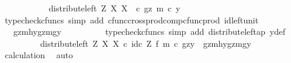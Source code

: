 \begin{isabellebody}
\ \ \ \ \ \ \isamarkupfalse%
\ \isamarkupfalse%
\ {\isachardoublequoteopen}{\isachardot}{\kern0pt}{\isachardot}{\kern0pt}{\isachardot}{\kern0pt}\ {\isacharequal}{\kern0pt}\ distribute{\isacharunderscore}{\kern0pt}left\ Z\ X\ X\ \ {\isasymcirc}\isactrlsub c\ {\isasymlangle}gz{\isacharcomma}{\kern0pt}\ m\ {\isasymcirc}\isactrlsub c\ y{\isasymrangle}{\isachardoublequoteclose}\isanewline
\ \ \ \ \ \ \ \ \isamarkupfalse%
\ {\isacharparenleft}{\kern0pt}typecheck{\isacharunderscore}{\kern0pt}cfuncs{\isacharcomma}{\kern0pt}\ simp\ add{\isacharcolon}{\kern0pt}\ cfunc{\isacharunderscore}{\kern0pt}cross{\isacharunderscore}{\kern0pt}prod{\isacharunderscore}{\kern0pt}comp{\isacharunderscore}{\kern0pt}cfunc{\isacharunderscore}{\kern0pt}prod\ id{\isacharunderscore}{\kern0pt}left{\isacharunderscore}{\kern0pt}unit{}{\isacharparenright}{\kern0pt}\isanewline
\ \ \ \ \ \ \isamarkupfalse%
\ \isamarkupfalse%
\ {\isachardoublequoteopen}{\isachardot}{\kern0pt}{\isachardot}{\kern0pt}{\isachardot}{\kern0pt}\ {\isacharequal}{\kern0pt}\ {\isasymlangle}{\isasymlangle}gz{\isacharcomma}{\kern0pt}mhy{}{\isasymrangle}{\isacharcomma}{\kern0pt}{\isasymlangle}gz{\isacharcomma}{\kern0pt}mgy{}{\isasymrangle}{\isasymrangle}{\isachardoublequoteclose}\isanewline
\ \ \ \ \ \ \ \ \isamarkupfalse%
\ {\isacharparenleft}{\kern0pt}typecheck{\isacharunderscore}{\kern0pt}cfuncs{\isacharcomma}{\kern0pt}\ simp\ add{\isacharcolon}{\kern0pt}\ distribute{\isacharunderscore}{\kern0pt}left{\isacharunderscore}{\kern0pt}ap\ y{\isacharunderscore}{\kern0pt}def{\isacharparenright}{\kern0pt}\isanewline
\ \ \ \ \ \ \isamarkupfalse%
\ \isamarkupfalse%
\ {\isachardoublequoteopen}{\isacharparenleft}{\kern0pt}distribute{\isacharunderscore}{\kern0pt}left\ Z\ X\ X\ {\isasymcirc}\isactrlsub c\ id\isactrlsub c\ Z\ {\isasymtimes}\isactrlsub f\ m{\isacharparenright}{\kern0pt}\ {\isasymcirc}\isactrlsub c\ {\isasymlangle}gz{\isacharcomma}{\kern0pt}y{\isasymrangle}\ {\isacharequal}{\kern0pt}\ {\isasymlangle}{\isasymlangle}gz{\isacharcomma}{\kern0pt}mhy{}{\isasymrangle}{\isacharcomma}{\kern0pt}{\isasymlangle}gz{\isacharcomma}{\kern0pt}mgy{}{\isasymrangle}{\isasymrangle}{\isachardoublequoteclose}\isanewline
\ \ \ \ \ \ \ \ \isamarkupfalse%
\ calculation\ \isamarkupfalse%
\ auto\isanewline
\ \ \ \ \isamarkupfalse%
\isanewline
\ \ \isamarkupfalse%
\isanewline
{}\isamarkupfalse%

\end{isabellebody}
